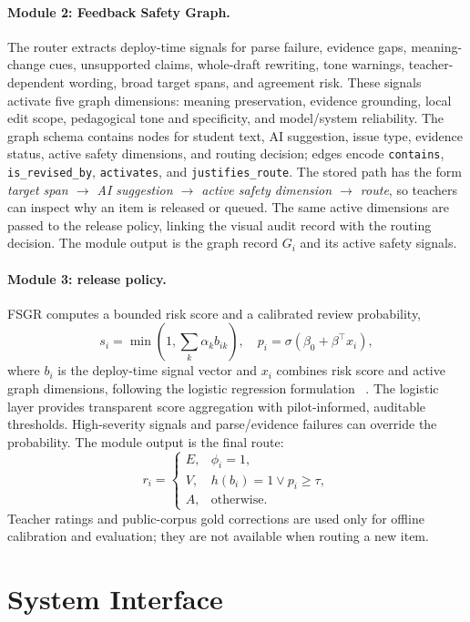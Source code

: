 \documentclass[11pt]{article}
\begin{document}
\paragraph{Module 2: Feedback Safety Graph.}
The router extracts deploy-time signals for parse failure, evidence gaps,
meaning-change cues, unsupported claims, whole-draft rewriting, tone warnings,
teacher-dependent wording, broad target spans, and agreement risk. These signals
activate five graph dimensions: meaning preservation, evidence grounding, local
edit scope, pedagogical tone and specificity, and model/system reliability. The
graph schema contains nodes for student text, AI suggestion, issue type, evidence
status, active safety dimensions, and routing decision; edges encode
\texttt{contains}, \texttt{is\_revised\_by}, \texttt{activates}, and
\texttt{justifies\_route}. The stored path has the form
\textit{target span $\rightarrow$ AI suggestion $\rightarrow$ active safety
dimension $\rightarrow$ route}, so teachers can inspect why an item is released
or queued. The same active dimensions are passed to the release policy, linking
the visual audit record with the routing decision. The
module output is the graph record $G_i$ and its active safety signals.

\paragraph{Module 3: release policy.}
FSGR computes a bounded risk score and a calibrated review probability,
\[
s_i=\min(1,\sum_k \alpha_k b_{ik}),\quad
p_i=\sigma(\beta_0+\beta^\top x_i),
\]
where $b_i$ is the deploy-time signal vector and $x_i$ combines risk score and
active graph dimensions, following the logistic regression formulation
~\cite{cox1958regression}. The logistic layer provides transparent score
aggregation with pilot-informed, auditable thresholds. High-severity signals and
parse/evidence failures can
override the probability. The module output is the final route:
\[
r_i =
\begin{cases}
E, & \phi_i=1,\\
V, & h(b_i)=1 \vee p_i\ge \tau,\\
A, & \text{otherwise}.
\end{cases}
\]
Teacher ratings and public-corpus gold corrections are used only for offline
calibration and evaluation; they are not available when routing a new item.

\section{System Interface}
\end{document}
